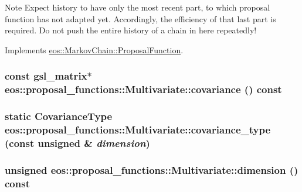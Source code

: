 \label{classeos_1_1proposal__functions_1_1Multivariate_a03a15f539c8b7eeefb7e323d8c3cd15d}
\begin{DoxyNote}{Note}
Expect history to have only the most recent part, to which proposal function has not adapted yet. Accordingly, the efficiency of that last part is required. Do not push the entire history of a chain in here repeatedly! 
\end{DoxyNote}


Implements \hyperlink{structeos_1_1MarkovChain_1_1ProposalFunction_afee6a937c53b9cfb257a5cd724a54296}{eos::MarkovChain::ProposalFunction}.\hypertarget{classeos_1_1proposal__functions_1_1Multivariate_a54a59c24424caeb5e826d61d63edd95d}{
\subsubsection[{covariance}]{\setlength{\rightskip}{0pt plus 5cm}const gsl\_\-matrix$\ast$ eos::proposal\_\-functions::Multivariate::covariance () const}}
\label{classeos_1_1proposal__functions_1_1Multivariate_a54a59c24424caeb5e826d61d63edd95d}
\hypertarget{classeos_1_1proposal__functions_1_1Multivariate_a4b7778284ee0ba2ea1ff85df8844da6e}{
\subsubsection[{covariance\_\-type}]{\setlength{\rightskip}{0pt plus 5cm}static {\bf CovarianceType} eos::proposal\_\-functions::Multivariate::covariance\_\-type (const unsigned \& {\em dimension})}}
\label{classeos_1_1proposal__functions_1_1Multivariate_a4b7778284ee0ba2ea1ff85df8844da6e}
\hypertarget{classeos_1_1proposal__functions_1_1Multivariate_aa7a6807a556a5187c77080d6b2036deb}{
\subsubsection[{dimension}]{\setlength{\rightskip}{0pt plus 5cm}unsigned eos::proposal\_\-functions::Multivariate::dimension () const}}
\label{classeos_1_1proposal__functions_1_1Multivariate_aa7a6807a556a5187c77080d6b2036deb}



